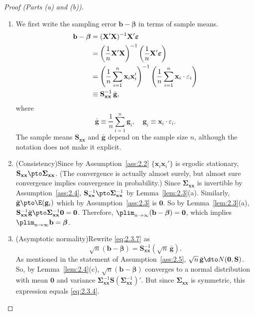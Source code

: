 \begin{proof}[Proof (Parts (a) and (b))]
\begin{enumerate}
\item We first write the sampling error $\mathbf{b} - \bm{\beta}$ in terms of sample
  means.
  \begin{align}
    \mathbf{b} - \bm{\beta}
    &= (\mathbf{X}'\mathbf{X})^{-1}\mathbf{X}'\bm{\varepsilon} \notag \\
    &= \left(\frac{1}{n}\mathbf{X}'\mathbf{X}\right)^{-1}
       \left(\frac{1}{n}\mathbf{X}'\bm{\varepsilon}\right) \notag \\
    &= \left(\frac{1}{n}\sum_{i=1}^{n} \mathbf{x}_i\mathbf{x}_i'\right)^{-1}
       \left(\frac{1}{n}\sum_{i=1}^{n} \mathbf{x}_i \cdot \varepsilon_i\right)
       \notag \\
    &\equiv \mathbf{S}_{\mathbf{xx}}^{-1}\,\bar{\mathbf{g}},
    \label{eq:2.3.7}
  \end{align}
  where
  \[
    \bar{\mathbf{g}} \equiv \frac{1}{n}\sum_{i=1}^{n} \mathbf{g}_i, \quad
    \mathbf{g}_i \equiv \mathbf{x}_i \cdot \varepsilon_i.
  \]
  The sample means $\mathbf{S}_{\mathbf{xx}}$ and $\bar{\mathbf{g}}$ depend on the
  sample size $n$, although the notation does not make it explicit.

\item (Consistency)\quad Since by Assumption~\ref{ass:2.2}
  $\{\mathbf{x}_i\mathbf{x}_i'\}$ is ergodic stationary,
  $\mathbf{S}_{\mathbf{xx}} \pto \bm{\Sigma}_{\mathbf{xx}}$.  (The convergence is
  actually almost surely, but almost sure convergence implies convergence in
  probability.)  Since $\bm{\Sigma}_{\mathbf{xx}}$ is invertible by
  Assumption~\ref{ass:2.4}, $\mathbf{S}_{\mathbf{xx}}^{-1} \pto
  \bm{\Sigma}_{\mathbf{xx}}^{-1}$ by Lemma~\ref{lem:2.3}(a).  Similarly,
  $\bar{\mathbf{g}} \pto \E(\mathbf{g}_i)$ which by Assumption~\ref{ass:2.3} is
  $\mathbf{0}$.  So by Lemma~\ref{lem:2.3}(a),
  $\mathbf{S}_{\mathbf{xx}}^{-1}\bar{\mathbf{g}} \pto
  \bm{\Sigma}_{\mathbf{xx}}^{-1}\mathbf{0} = \mathbf{0}$.  Therefore,
  $\plim_{n \to \infty}(\mathbf{b} - \bm{\beta}) = \mathbf{0}$, which implies
  $\plim_{n \to \infty} \mathbf{b} = \bm{\beta}$.

\item (Asymptotic normality)\quad Rewrite \eqref{eq:2.3.7} as
  \begin{equation}
    \sqrt{n}(\mathbf{b} - \bm{\beta})
    = \mathbf{S}_{\mathbf{xx}}^{-1}(\sqrt{n}\,\bar{\mathbf{g}}).
    \label{eq:2.3.8}
  \end{equation}
  As mentioned in the statement of Assumption~\ref{ass:2.5},
  $\sqrt{n}\,\bar{\mathbf{g}} \dto N(\mathbf{0}, \mathbf{S})$.  So, by
  Lemma~\ref{lem:2.4}(c), $\sqrt{n}(\mathbf{b} - \bm{\beta})$ converges to a normal
  distribution with mean $\mathbf{0}$ and variance
  $\bm{\Sigma}_{\mathbf{xx}}^{-1}\mathbf{S}(\bm{\Sigma}_{\mathbf{xx}}^{-1})'$.
  But since $\bm{\Sigma}_{\mathbf{xx}}$ is symmetric, this expression equals
  \eqref{eq:2.3.4}. \qedhere
\end{enumerate}
\end{proof}

